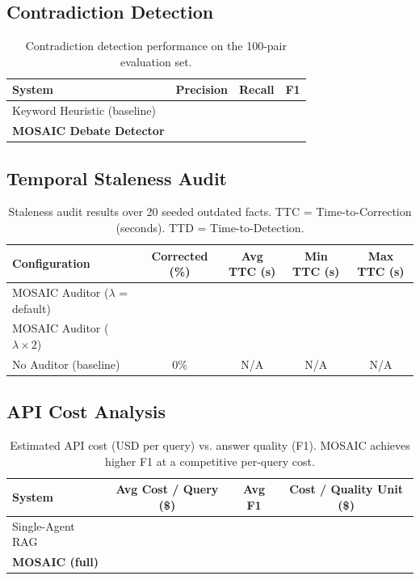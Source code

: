 \documentclass{article}
\begin{document}
\subsection{Contradiction Detection}

\begin{table}[ht]
  \centering
  \caption{Contradiction detection performance on the 100-pair evaluation set.}
  \label{tab:contradiction}
  \begin{tabular}{lccc}
    \toprule
    System & Precision & Recall & F1 \\
    \midrule
    Keyword Heuristic (baseline) & \todo{--} & \todo{--} & \todo{--} \\
    \textbf{MOSAIC Debate Detector} & \textbf{\todo{--}} & \textbf{\todo{--}} & \textbf{\todo{--}} \\
    \bottomrule
  \end{tabular}
\end{table}

\subsection{Temporal Staleness Audit}

\begin{table}[ht]
  \centering
  \caption{Staleness audit results over 20 seeded outdated facts.
    TTC = Time-to-Correction (seconds). TTD = Time-to-Detection.}
  \label{tab:staleness}
  \begin{tabular}{lcccc}
    \toprule
    Configuration & Corrected (\%) & Avg TTC (s) & Min TTC (s) & Max TTC (s) \\
    \midrule
    MOSAIC Auditor ($\lambda$ = default) & \todo{--} & \todo{--} & \todo{--} & \todo{--} \\
    MOSAIC Auditor ($\lambda \times 2$)  & \todo{--} & \todo{--} & \todo{--} & \todo{--} \\
    No Auditor (baseline)                & 0\%      & N/A       & N/A       & N/A \\
    \bottomrule
  \end{tabular}
\end{table}

\subsection{API Cost Analysis}

\begin{table}[ht]
  \centering
  \caption{Estimated API cost (USD per query) vs. answer quality (F1).
    MOSAIC achieves higher F1 at a competitive per-query cost.}
  \label{tab:cost}
  \begin{tabular}{lccc}
    \toprule
    System & Avg Cost / Query (\$) & Avg F1 & Cost / Quality Unit (\$) \\
    \midrule
    Single-Agent RAG       & \todo{--} & \todo{--} & \todo{--} \\
    \textbf{MOSAIC (full)} & \todo{--} & \textbf{\todo{--}} & \todo{--} \\
    \bottomrule
  \end{tabular}
\end{table}
\end{document}
